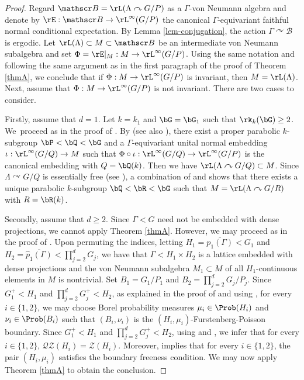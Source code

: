 \begin{proof}
Regard $\mathscr B = \rL(\Lambda \curvearrowright G/P)$ as a $\Gamma$-von Neumann algebra and denote by \hbox{$\rE : \mathscr B \to \rL^\infty(G/P)$} the canonical $\Gamma$-equivariant faithful normal conditional expectation. By Lemma \ref{lem-conjugation}, the action $\Gamma \curvearrowright \mathscr B$ is ergodic. Let $\rL(\Lambda) \subset M \subset \mathscr B$ be an intermediate von Neumann subalgebra and set $\Phi = \rE|_M : M \to \rL^\infty(G/P)$. \hbox{Using} the same notation and following the same argument as in the first paragraph of the proof of Theorem \ref{thmA}, we conclude that if $\Phi : M \to \rL^\infty(G/P)$ is invariant, then $M = \rL(\Lambda)$. Next, assume that $\Phi : M \to \rL^\infty(G/P)$ is not invariant. There are two cases to consider.

Firstly, assume that $d = 1$. Let $k = k_1$ and $\bG = \bG_1$ such that $\rk_k(\bG) \geq 2$. We~proceed as in the proof of \cite[Th.\,D]{BBH21}. By \cite[Th.\,5.4]{BBH21} (see also \cite[Th.\,B]{BH19}), there exist a proper parabolic $k$-subgroup $\bP < \bQ < \bG$ and a $\Gamma$-equivariant unital normal embedding $\iota : \rL^\infty(G/Q) \to M$ such that $\Phi \circ \iota : \rL^\infty(G/Q) \to \rL^\infty(G/P)$ is the canonical embedding with $Q = \bQ(k)$. Then we have $\rL(\Lambda \curvearrowright G/Q) \subset M$. Since $\Lambda \curvearrowright G/Q$ is essentially free (see \cite[Lem.\,6.2]{BBHP20}), a combination of \cite[Th.\,IV.2.11]{Ma91} and \cite[Th.\,3.6]{Su18} shows that there exists a unique parabolic $k$-subgroup $\bQ < \bR < \bG$ such that $M = \rL(\Lambda \curvearrowright G/R)$ with $R = \bR(k)$.

Secondly, assume that $d \geq 2$. Since $\Gamma < G$ need not be embedded with dense projections, we cannot apply Theorem \ref{thmA}. However, we may proceed as in the proof of \cite[Prop.\,6.1]{BBHP20}. Upon permuting the indices, letting $H_1 = \overline{p_1(\Gamma)} < G_1$ and $H_2 = \overline{\widehat p_1(\Gamma)} < \prod_{j = 2}^d G_j$, we have that $\Gamma < H_1 \times H_2$ is a lattice embedded with dense projections and the von Neumann subalgebra $M_1 \subset M$ of all $H_1$-continuous elements in $M$ is nontrivial. Set $B_1 = G_1/P_1$ and $B_2 = \prod_{j = 2}^d G_j/P_j$. Since $G_1^+ < H_1$ and $\prod_{j = 2}^d G_j^+ < H_2$, as explained in the proof of \cite[Prop.\,6.1]{BBHP20} and using \cite[Cor.\,5.2]{BS04}, for every $i \in \{1, 2\}$, we may choose Borel probability measures $\mu_i \in \Prob(H_i)$ and $\nu_i \in \Prob(B_i)$ such that $(B_i, \nu_i)$ is the $(H_i, \mu_i)$-Furstenberg-Poisson boundary. Since $G_1^+ < H_1$ and $\prod_{j = 2}^d G_j^+ < H_2$, using \cite[Th.\,I.1.5.6(i)]{Ma91} and \cite[Prop.\,4.3]{CM08}, we infer that for every $i \in \{1, 2\}$, $\mathscr{Q}\mathscr{Z}(H_i) = \mathscr Z(H_i)$. Moreover, \cite[Lem.\,6.2]{BBHP20} implies that for every $i \in \{1, 2\}$, the pair $(H_i, \mu_i)$ satisfies the boundary freeness condition. We may now apply Theorem \ref{thmA} to obtain the conclusion.


\end{proof}
